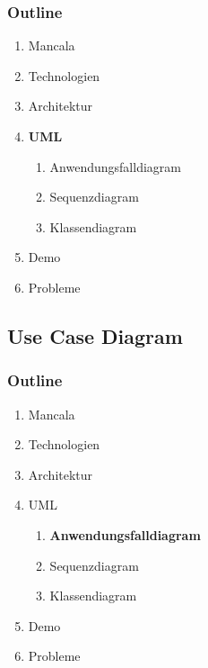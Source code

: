 \documentclass[
	10pt,
	t		%
]{beamer}
\begin{document}
\begin{frame}
\frametitle{Outline}
\begin{enumerate}
\item Mancala
\item Technologien
\item Architektur
\item \textbf{UML}
\begin{enumerate}
\item Anwendungsfalldiagram
\item Sequenzdiagram
\item Klassendiagram
\end{enumerate}
\item Demo
\item Probleme
\end{enumerate}
\end{frame}

\subsection{Use Case Diagram}
\begin{frame}
\frametitle{Outline}
\begin{enumerate}
\item Mancala
\item Technologien
\item Architektur
\item UML
\begin{enumerate}
\item \textbf{Anwendungsfalldiagram}
\item Sequenzdiagram
\item Klassendiagram
\end{enumerate}
\item Demo
\item Probleme
\end{enumerate}
\end{frame}
\end{document}
